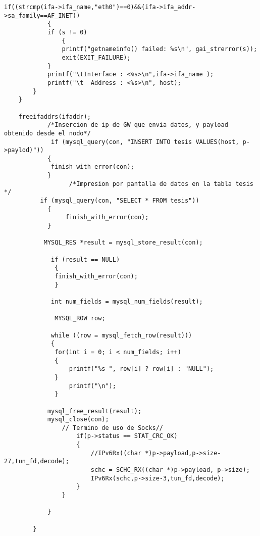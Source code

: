 \begin{lstlisting}[frame=single,caption=Extracto de código del módulo de transición LoRa/IPv6	]
	        if((strcmp(ifa->ifa_name,"eth0")==0)&&(ifa->ifa_addr->sa_family==AF_INET))
	        {
            if (s != 0)
        	    {
                printf("getnameinfo() failed: %s\n", gai_strerror(s));
                exit(EXIT_FAILURE);
            }
            printf("\tInterface : <%s>\n",ifa->ifa_name );
            printf("\t  Address : <%s>\n", host); 
        }
    }

    freeifaddrs(ifaddr);
            /*Insercion de ip de GW que envia datos, y payload obtenido desde el nodo*/
	 	     if (mysql_query(con, "INSERT INTO tesis VALUES(host, p->paylod)"))
			{
			 finish_with_error(con);
			}
                  /*Impresion por pantalla de datos en la tabla tesis */  
		  if (mysql_query(con, "SELECT * FROM tesis")) 
  			{
      			 finish_with_error(con);
  			} 

		   MYSQL_RES *result = mysql_store_result(con);
  
		     if (result == NULL) 
		      {
		      finish_with_error(con);
		      }

		     int num_fields = mysql_num_fields(result);

		      MYSQL_ROW row;
  
		     while ((row = mysql_fetch_row(result))) 
		     { 
		      for(int i = 0; i < num_fields; i++) 
		      { 
		          printf("%s ", row[i] ? row[i] : "NULL"); 
		      } 
		          printf("\n"); 
		      }
  
		    mysql_free_result(result);
		    mysql_close(con);
 	            // Termino de uso de Socks//
                    if(p->status == STAT_CRC_OK)
                    {
                        //IPv6Rx((char *)p->payload,p->size-27,tun_fd,decode);
                        schc = SCHC_RX((char *)p->payload, p->size);
                        IPv6Rx(schc,p->size-3,tun_fd,decode);
                    }
                }
                
            }
             
        }

\end{lstlisting}
\label{anexc:1}

%
%